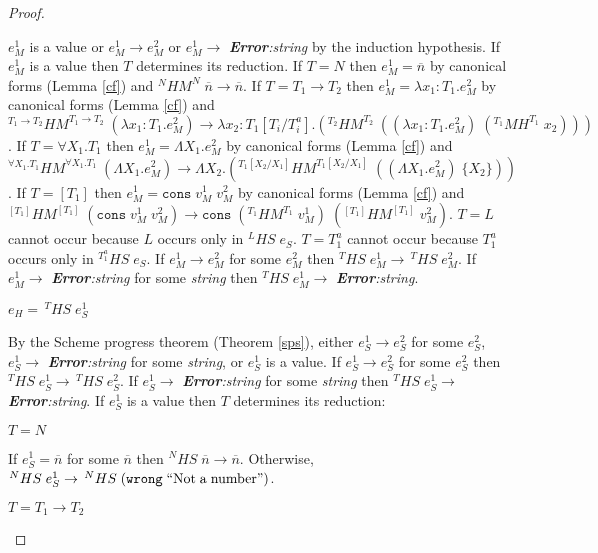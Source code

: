 \begin{theorem}
\begin{proof}
\begin{case}
$e_{M}^{1}$ is a value or $e_{M}^{1}\rightarrow e_{M}^{2}$ or $e_{M}^{1}\rightarrow$ \emph{\textbf{Error}:\;string} by the induction hypothesis.  If $e_{M}^{1}$ is a value then $T$ determines its reduction.  If $T=N$ then $e_{M}^{1}=\overline{n}$ by canonical forms (Lemma \ref{cf}) and $^{N}HM^{N}\;\overline{n}\rightarrow\overline{n}$.  If $T=T_{1}\rightarrow T_{2}$ then $e_{M}^{1}=\lambda x_{1}:T_{1}.e_{M}^{2}$ by canonical forms (Lemma \ref{cf}) and $^{T_{1}\rightarrow T_{2}}HM^{T_{1}\rightarrow T_{2}}\;(\lambda x_{1}:T_{1}.e_{M}^{2})\rightarrow\lambda x_{2}:T_{1}[T_{i}/T^{a}_{i}].(^{T_{2}}HM^{T_{2}}\;((\lambda x_{1}:T_{1}.e_{M}^{2})\;(^{T_{1}}MH^{T_{1}}\;x_{2})))$.  If $T=\forall X_{1}.T_{1}$ then $e_{M}^{1}=\Lambda X_{1}.e_{M}^{2}$ by canonical forms (Lemma \ref{cf}) and $^{\forall X_{1}.T_{1}}HM^{\forall X_{1}.T_{1}}\;(\Lambda X_{1}.e_{M}^{2})\rightarrow\Lambda X_{2}.(^{T_{1}[X_{2}/X_{1}]}HM^{T_{1}[X_{2}/X_{1}]}\;((\Lambda X_{1}.e_{M}^{2})\;\lbrace X_{2}\rbrace))$.  If $T=[T_{1}]$ then $e_{M}^{1}=\mathtt{cons}\;v_{M}^{1}\;v_{M}^{2}$ by canonical forms (Lemma \ref{cf}) and $^{[T_{1}]}HM^{[T_{1}]}\;(\mathtt{cons}\;v_{M}^{1}\;v_{M}^{2})\rightarrow\mathtt{cons}\;(^{T_{1}}HM^{T_{1}}\;v_{M}^{1})\;(^{[T_{1}]}HM^{[T_{1}]}\;v_{M}^{2})$.  $T=L$ cannot occur because $L$ occurs only in $^{L}HS\;e_{S}$.  $T=T_{1}^{a}$ cannot occur because $T_{1}^{a}$ occurs only in $^{T_{1}^{a}}HS\;e_{S}$.  If $e_{M}^{1}\rightarrow e_{M}^{2}$ for some $e_{M}^{2}$ then $^{T}HS\;e_{M}^{1}\rightarrow\,^{T}HS\;e_{M}^{2}$.  If $e_{M}^{1}\rightarrow$ \emph{\textbf{Error}:\;string} for some \emph{string} then $^{T}HS\;e_{M}^{1}\rightarrow$ \emph{\textbf{Error}:\;string}.
\end{case}
\begin{case}
$e_{H}=\,^{T}HS\;e_{S}^{1}$

By the Scheme progress theorem (Theorem \ref{sps}), either $e_{S}^{1}\rightarrow e_{S}^{2}$ for some $e_{S}^{2}$, $e_{S}^{1}\rightarrow$ \emph{\textbf{Error}:\;string} for some \emph{string}, or $e_{S}^{1}$ is a value.  If $e_{S}^{1}\rightarrow e_{S}^{2}$ for some $e_{S}^{2}$ then $^{T}HS\;e_{S}^{1}\rightarrow\,^{T}HS\;e_{S}^{2}$.  If $e_{S}^{1}\rightarrow$ \emph{\textbf{Error}:\;string} for some \emph{string} then $^{T}HS\;e_{S}^{1}\rightarrow$ \emph{\textbf{Error}:\;string}.  If $e_{S}^{1}$ is a value then $T$ determines its reduction:
\begin{case}
$T=N$

If $e_{S}^{1}=\overline{n}$ for some $\overline{n}$ then $^{N}HS\;\overline{n}\rightarrow\overline{n}$.  Otherwise, $^{N}HS\;e_{S}^{1}\rightarrow\,^{N}HS\;(\mathtt{wrong}\;\mathrm{``Not\;a\;number"})$.
\end{case}
\begin{case}
$T=T_{1}\rightarrow T_{2}$


\end{case}
\end{case}
\end{proof}
\end{theorem}
